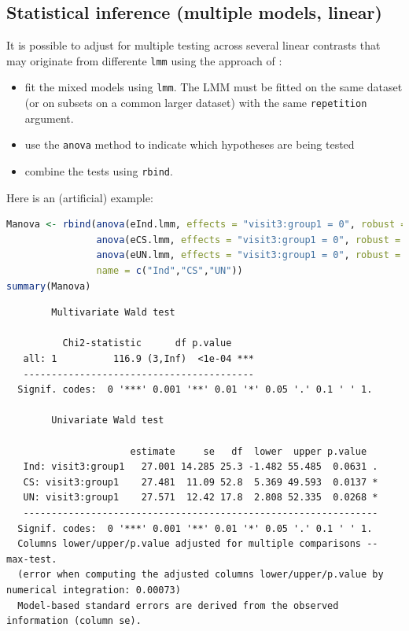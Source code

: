 \documentclass[12pt]{article}
\begin{document}
\clearpage
\subsection{Statistical inference (multiple models, linear)}
\label{sec:org19055b1}

It is possible to adjust for multiple testing across several linear
contrasts that may originate from differente \texttt{lmm} using the approach
of \cite{pipper2012versatile}:
\begin{itemize}
\item fit the mixed models using \texttt{lmm}. The LMM must be fitted on the same
dataset (or on subsets on a common larger dataset) with the same \texttt{repetition} argument.
\item use the \texttt{anova} method to indicate which hypotheses are being tested
\item combine the tests using \texttt{rbind}.
\end{itemize}

Here is an (artificial) example:
\begin{lstlisting}[language=r,numbers=none]
Manova <- rbind(anova(eInd.lmm, effects = "visit3:group1 = 0", robust = FALSE),
                anova(eCS.lmm, effects = "visit3:group1 = 0", robust = FALSE),
                anova(eUN.lmm, effects = "visit3:group1 = 0", robust = FALSE),
                name = c("Ind","CS","UN"))
summary(Manova) 
\end{lstlisting}

\label{}
\begin{verbatim}
		Multivariate Wald test 

          Chi2-statistic      df p.value    
   all: 1          116.9 (3,Inf)  <1e-04 ***
   ----------------------------------------- 
  Signif. codes:  0 '***' 0.001 '**' 0.01 '*' 0.05 '.' 0.1 ' ' 1.

		Univariate Wald test 

                      estimate     se   df  lower  upper p.value  
   Ind: visit3:group1   27.001 14.285 25.3 -1.482 55.485  0.0631 .
   CS: visit3:group1    27.481  11.09 52.8  5.369 49.593  0.0137 *
   UN: visit3:group1    27.571  12.42 17.8  2.808 52.335  0.0268 *
   --------------------------------------------------------------- 
  Signif. codes:  0 '***' 0.001 '**' 0.01 '*' 0.05 '.' 0.1 ' ' 1.
  Columns lower/upper/p.value adjusted for multiple comparisons -- max-test.
  (error when computing the adjusted columns lower/upper/p.value by numerical integration: 0.00073)
  Model-based standard errors are derived from the observed information (column se).
\end{verbatim}
\end{document}
